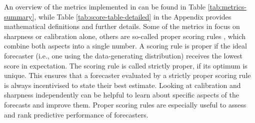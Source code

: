 \documentclass[
]{jss}
\begin{document}
An overview of the metrics implemented in  can be
found in Table \ref{tab:metrics-summary}, while Table
\ref{tab:score-table-detailed} in the Appendix provides mathematical
definitions and further details. Some of the metrics in
 focus on sharpness or calibration alone, others are
so-called proper scoring rules
\citep{gneitingStrictlyProperScoring2007}, which combine both aspects
into a single number. A scoring rule is proper if the ideal forecaster
(i.e., one using the data-generating distribution) receives the lowest
score in expectation. The scoring rule is called strictly proper, if its
optimum is unique. This ensures that a forecaster evaluated by a
strictly proper scoring rule is always incentivised to state their best
estimate. Looking at calibration and sharpness independently can be
helpful to learn about specific aspects of the forecasts and improve
them. Proper scoring rules are especially useful to assess and rank
predictive performance of forecasters.

\newpage
\end{document}
